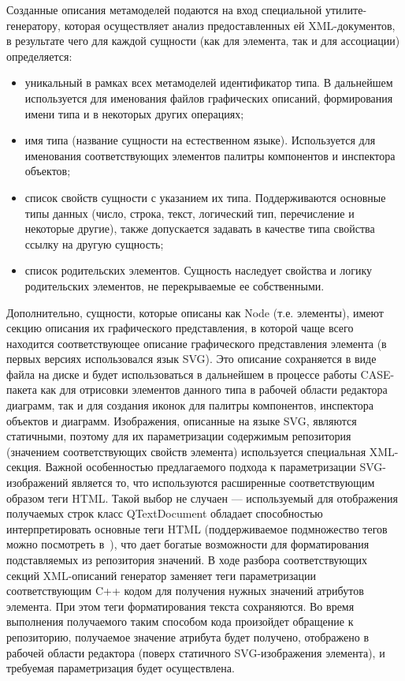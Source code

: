 \documentclass[a5paper]{article}
\begin{document}
Созданные описания метамоделей подаются на вход специальной
утилите-генератору, которая осуществляет анализ предоставленных ей
XML-документов, в результате чего для
каждой сущности (как для элемента, так и для ассоциации) определяется:

\begin{itemize}
  \item уникальный в рамках всех метамоделей идентификатор типа. В дальнейшем
        используется для именования файлов графических описаний, формирования
        имени типа и в некоторых других операциях;
  \item имя типа (название сущности на естественном языке). Используется для
        именования соответствующих элементов палитры компонентов и инспектора
        объектов;
  \item список свойств сущности с указанием их типа. Поддерживаются основные
        типы данных (число, строка, текст, логический тип, перечисление и
        некоторые другие), также допускается задавать в качестве типа свойства
        ссылку на другую сущность;
  \item список родительских элементов. Сущность наследует свойства и логику
        родительских элементов, не перекрываемые ее собственными.
\end{itemize}

Дополнительно, сущности, которые описаны как
Node (т.е. элементы), имеют секцию описания
их графического представления, в которой чаще всего находится
соответствующее описание графического представления элемента (в первых
версиях использовался язык SVG). Это
описание сохраняется в виде файла на диске и будет использоваться в
дальнейшем в процессе работы CASE-пакета
как для отрисовки элементов данного типа в рабочей области редактора
диаграмм, так и для создания иконок для палитры компонентов, инспектора
объектов и диаграмм. Изображения, описанные на языке SVG, являются статичными, поэтому для их
параметризации содержимым репозитория (значением соответствующих
свойств элемента) используется специальная
XML-секция. Важной особенностью предлагаемого подхода к параметризации
SVG-изображений является то, что используются расширенные соответствующим образом теги
HTML. Такой выбор не случаен --- используемый
для отображения получаемых строк класс QTextDocument обладает способностью
интерпретировать основные теги HTML
(поддерживаемое подмножество тегов можно посмотреть в~\cite{htmlInQt}), что дает
богатые возможности для форматирования подставляемых из репозитория
значений. В ходе разбора соответствующих секций XML-описаний генератор заменяет теги
параметризации соответствующим C++ кодом для
получения нужных значений атрибутов элемента. При этом теги
форматирования текста сохраняются. Во время выполнения получаемого
таким способом кода произойдет обращение к репозиторию,
получаемое значение атрибута будет получено, отображено в рабочей
области редактора (поверх статичного SVG-изображения элемента), и требуемая
параметризация будет осуществлена.
\end{document}
